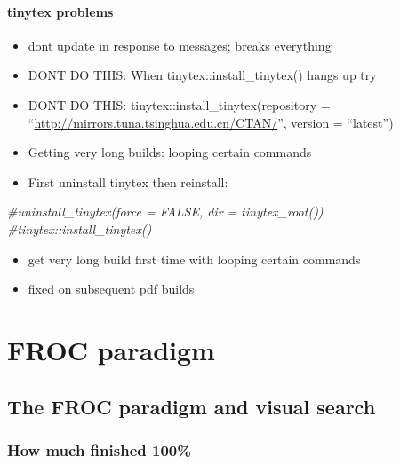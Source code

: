 \documentclass[
]{book}
\newenvironment{Shaded}{\begin{snugshade}}{\end{snugshade}}
\newcommand{\CommentTok}[1]{\textcolor[rgb]{0.56,0.35,0.01}{\textit{#1}}}
\providecommand{\tightlist}{%
  \setlength{\itemsep}{0pt}\setlength{\parskip}{0pt}}
\begin{document}
\hypertarget{tinytex-problems}{%
\subsection{tinytex problems}\label{tinytex-problems}}

\begin{itemize}
\tightlist
\item
  dont update in response to messages; breaks everything
\item
  DONT DO THIS: When tinytex::install\_tinytex() hangs up try
\item
  DONT DO THIS: tinytex::install\_tinytex(repository = ``\url{http://mirrors.tuna.tsinghua.edu.cn/CTAN/}'', version = ``latest'')
\item
  Getting very long builds: looping certain commands
\item
  First uninstall tinytex then reinstall:
\end{itemize}

\begin{Shaded}
\begin{Highlighting}[]
\CommentTok{\#uninstall\_tinytex(force = FALSE, dir = tinytex\_root())}
\CommentTok{\#tinytex::install\_tinytex()}
\end{Highlighting}
\end{Shaded}

\begin{itemize}
\tightlist
\item
  get very long build first time with looping certain commands
\item
  fixed on subsequent pdf builds
\end{itemize}

\hypertarget{part-froc-paradigm}{%
\part*{FROC paradigm}\label{part-froc-paradigm}}

\hypertarget{froc-paradigm}{%
\chapter{The FROC paradigm and visual search}\label{froc-paradigm}}

\hypertarget{froc-paradigm-how-much-finished}{%
\section{How much finished 100\%}\label{froc-paradigm-how-much-finished}}
\end{document}
